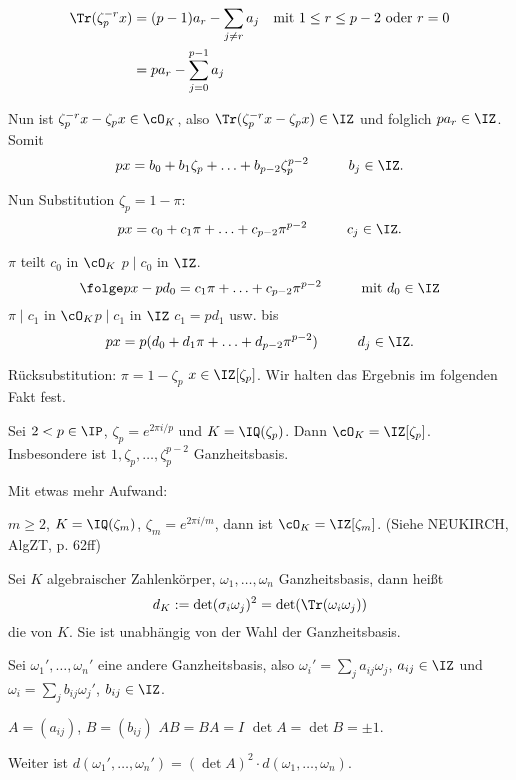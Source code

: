 
\renewcommand{\lecdate}{04.11.14}

\begin{align*}
\Tr(\zeta_p^{-r} x) &= (p-1)a_r-\sum_{j\neq r} a_j && \text{mit } 1\leq r\leq p-2 \mbox{ oder } r=0\\
&= pa_r - \sum_{j=0}^{p-1} a_j
\end{align*}

Nun ist $\zeta_p^{-r}x-\zeta_px\in \cO_K$, also $\Tr(\zeta_p^{-r}x-\zeta_px)\in \IZ$ und folglich $pa_r\in\IZ$. Somit
\[px=b_0+b_1\zeta_p+\ldots + b_{p-2}\zeta_p^{p-2}\hspace{1cm} b_j\in\IZ.\]

Nun Substitution $\zeta_p=1-\pi$:
\[px=c_0+c_1\pi+\ldots+ c_{p-2}\pi^{p-2}\hspace{1cm} c_j\in\IZ. \]

$\pi$ teilt $c_0$ in $\cO_K$ \folge[L2] $p\mid c_0$ in $\IZ$.
\[ \folge px-pd_0=c_1\pi+\ldots + c_{p-2}\pi^{p-2}\hspace{1cm}\mbox{mit } d_0\in\IZ\]
$\pi\mid c_1$ in $\cO_K$\folge $p\mid c_1$ in $\IZ$ \folge $c_1=pd_1$ usw. bis 
\[ px=p(d_0+d_1\pi+\ldots +d_{p-2}\pi^{p-2})\hspace{1cm} d_j\in\IZ.\]

Rücksubstitution: $\pi=1-\zeta_p$ \folge $x\in\IZ[\zeta_p]$. Wir halten das Ergebnis im folgenden Fakt fest.

\begin{Fakt}
Sei $2<p\in\IP$, $\zeta_p=e^{2\pi i/p}$ und $K=\IQ(\zeta_p)$. Dann $\cO_K=\IZ[\zeta_p]$. Insbesondere ist $1,\zeta_p,\ldots,\zeta_p^{p-2}$ Ganzheitsbasis.
\end{Fakt}

\begin{Bemerkung}
 Mit etwas mehr Aufwand:
 
 $m\geq 2$, $K=\IQ(\zeta_m)$, $\zeta_m=e^{2\pi i/m}$, dann ist $\cO_K=\IZ[\zeta_m]$. (Siehe NEUKIRCH, AlgZT, p. 62ff)
\end{Bemerkung}

\begin{Fakt}
 Sei $K$ algebraischer Zahlenkörper, $\omega_1,\ldots,\omega_n$ Ganzheitsbasis, dann heißt
 \[ d_K:= \det(\sigma_i\omega_j)^2=\det(\Tr(\omega_i\omega_j))\]
 die  von $K$.
 Sie ist unabhängig von der Wahl der Ganzheitsbasis.
\end{Fakt}

\begin{Beweis}
 Sei $\omega_1',\ldots,\omega_n'$ eine andere Ganzheitsbasis, also $\omega_i'=\sum_j a_{ij} \omega_j$, $a_{ij}\in\IZ$ und $\omega_i=\sum_j b_{ij}\omega_j'$, $b_{ij}\in\IZ$.
 
 $A=(a_{ij})$, $B=(b_{ij})$ \folge $AB=BA=I$ \folge $\det A=\det B =\pm 1$.
 
 Weiter ist $d(\omega_1',\ldots,\omega_n')=(\det A)^2 \cdot d(\omega_1,\ldots,\omega_n)$.
\end{Beweis}


